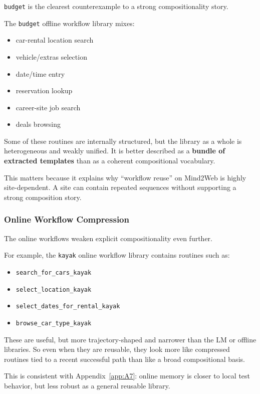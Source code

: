 \texttt{budget} is the clearest counterexample to a strong
compositionality story.

The \texttt{budget} offline workflow library mixes:

\begin{itemize}
\tightlist
\item
  car-rental location search
\item
  vehicle/extras selection
\item
  date/time entry
\item
  reservation lookup
\item
  career-site job search
\item
  deals browsing
\end{itemize}

Some of these routines are internally structured, but the library as a
whole is heterogeneous and weakly unified. It is better described as a
\textbf{bundle of extracted templates} than as a coherent compositional
vocabulary.

This matters because it explains why ``workflow reuse'' on Mind2Web is
highly site-dependent. A site can contain repeated sequences without
supporting a strong composition story.

\subsubsection{Online Workflow
Compression}

The online workflows weaken explicit compositionality even further.

For example, the \texttt{kayak} online workflow library contains
routines such as:

\begin{itemize}
\tightlist
\item
  \texttt{search\_for\_cars\_kayak}
\item
  \texttt{select\_location\_kayak}
\item
  \texttt{select\_dates\_for\_rental\_kayak}
\item
  \texttt{browse\_car\_type\_kayak}
\end{itemize}

These are useful, but more trajectory-shaped and narrower than the LM or
offline libraries. So even when they are reusable, they look more like
compressed routines tied to a recent successful path than like a broad
compositional basis.

This is consistent with Appendix~\ref{app:A7}:
online memory is closer to local test behavior, but less robust as a
general reusable library.

